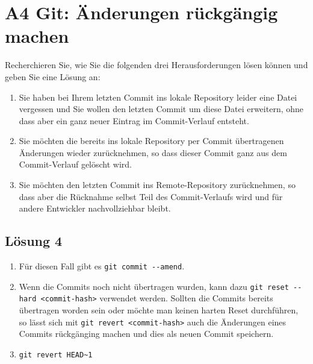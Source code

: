 \documentclass[main.tex]{subfiles}
\begin{document}
\section{A4 Git: Änderungen rückgängig machen}
Recherchieren Sie, wie Sie die folgenden drei Herausforderungen lösen können und geben Sie
eine Lösung an:

\begin{enumerate}
\item Sie haben bei Ihrem letzten Commit ins lokale Repository leider eine Datei vergessen und Sie wollen den letzten Commit um diese Datei erweitern, ohne dass aber ein ganz neuer Eintrag im Commit-Verlauf entsteht.
\item Sie möchten die bereits ins lokale Repository per Commit übertragenen Änderungen wieder zurücknehmen, so dass dieser Commit ganz aus dem Commit-Verlauf gelöscht wird.
\item Sie möchten den letzten Commit ins Remote-Repository zurücknehmen, so dass aber die Rücknahme selbst Teil des Commit-Verlaufs wird und für andere Entwickler nachvollziehbar bleibt.
\end{enumerate}

\subsection{Lösung 4}
\begin{enumerate}
    \item Für diesen Fall gibt es \lstinline|git commit --amend|.
    \item Wenn die Commits noch nicht übertragen wurden, kann dazu \lstinline|git reset --hard <commit-hash>| verwendet werden. Sollten die Commits bereits übertragen worden sein oder möchte man keinen harten Reset durchführen, so lässt sich mit \lstinline|git revert <commit-hash>| auch die Änderungen eines Commits rückgänging machen und dies als neuen Commit speichern.
    \item \lstinline|git revert HEAD~1|
\end{enumerate}
\end{document}
